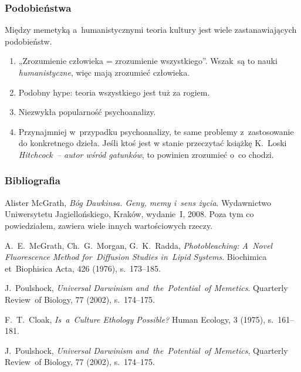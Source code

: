 \documentclass[10pt,t]{beamer}
\begin{document}
\begin{frame}
  \frametitle{Podobieństwa}


  Między memetyką a~humanistycznymi teoria kultury jest wiele
  zastanawiających podobieństw.
  \begin{enumerate}
    \RaggedRight

  \item „Zrozumienie człowieka = zrozumienie wszystkiego”.
    Wszak~są to nauki \textit{humanistyczne}, więc mają zrozumieć
    człowieka.

  \item Podobny hype: teoria wszystkiego jest tuż za rogiem.

  \item Niezwykła popularność psychoanalizy.

  \item Przynajmniej w~przypadku psychoanalizy, te same problemy
    z~zastosowanie do konkretnego dzieła. Jeśli ktoś jest w stanie
    przeczytać książkę K.~Loski \textit{Hitchcock~-- autor wśród gatunków},
    to powinien zrozumieć o~co chodzi.

  \end{enumerate}

\end{frame}




















\begin{frame}
  \frametitle{Bibliografia}


  Alister McGrath, \textit{Bóg Dawkinsa. Geny, memy i~sens
    życia}. Wydawnictwo Uniwersytetu Jagiellońskiego, Kraków,
  wydanie~I, 2008. Poza tym co powiedziałem, zawiera wiele innych
  wartościowych rzeczy.

  A.~E.~McGrath, Ch.~G.~Morgan, G.~K.~Radda,
  \textit{Photobleaching: A~Novel Fluorescence Method for~Diffusion
    Studies in~Lipid Systems}. Biochimica et~Biophisica Acta,
  426 (1976), s.~173--185.

  J.~Poulshock, \textit{Universal Darwinism
    and~the~Potential~of Memetics}. Quarterly Review~of
  Biology, 77 (2002), s.~174--175.

  F.~T.~Cloak, \textit{Is~a~Culture Ethology Possible?}
  Human Ecology, 3 (1975), s.~161--181.

  J.~Poulshock, \textit{Universal Darwinism and~the~Potential~of
    Memetics}, Quarterly Review~of Biology, 77 (2002), s.~174--175.

\end{frame}
\end{document}
